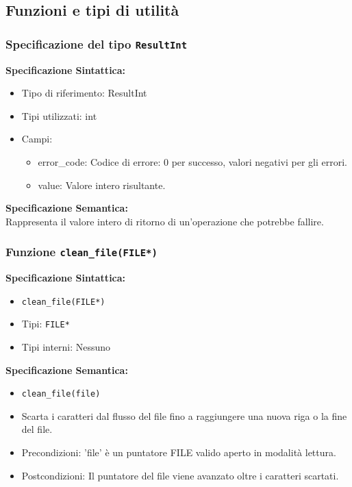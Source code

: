 \documentclass[11pt]{scrartcl} %
\begin{document}
\subsection{Funzioni e tipi di utilità}

\subsubsection{Specificazione del tipo \texttt{ResultInt}}


\textbf{Specificazione Sintattica:}
\begin{itemize}
	\item Tipo di riferimento: ResultInt
	\item Tipi utilizzati: int
	\item Campi:
	      \begin{itemize}
		      \item error\_code: Codice di errore: 0 per successo, valori negativi per gli errori.
		      \item value: Valore intero risultante.
	      \end{itemize}
\end{itemize}



\textbf{Specificazione Semantica:} \\
Rappresenta il valore intero di ritorno di un'operazione che potrebbe fallire.

\subsubsection{Funzione \texttt{clean\_file(FILE*)}}

\textbf{Specificazione Sintattica:}
\begin{itemize}
	\item \texttt{clean\_file(FILE*)}
	\item Tipi: \texttt{FILE*}
	\item Tipi interni: Nessuno
\end{itemize}

\textbf{Specificazione Semantica:}
\begin{itemize}
	\item \texttt{clean\_file(file)}
	\item Scarta i caratteri dal flusso del file fino a raggiungere una nuova riga o la fine del file.
	\item Precondizioni: 'file' è un puntatore FILE valido aperto in modalità lettura.
	\item Postcondizioni: Il puntatore del file viene avanzato oltre i caratteri scartati.
\end{itemize}
\end{document}
